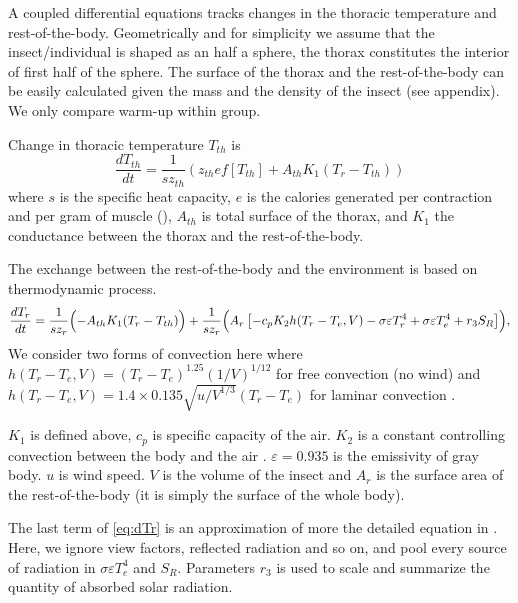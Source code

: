 A coupled differential equations  tracks changes in the thoracic temperature and rest-of-the-body.%
Geometrically and for simplicity we  assume that the insect/individual is shaped as an half a sphere, the thorax constitutes the interior of first half of the sphere.
The surface of the thorax and the rest-of-the-body can be easily calculated given the mass and the density of the insect (see appendix).
We only compare warm-up within group.

Change in thoracic temperature $T_{th}$ is 
\begin{equation} \label{eq:dTh}
	\frac{dT_{th}}{dt} = \frac{1}{s z_{th}} (z_{th} e f[T_{th}] +  A_{th} K_1(T_r - T_{th}))
\end{equation}
where $s$ is the specific heat capacity, $e$ is the calories generated per contraction and per gram of muscle (\citep{Kammer1974}), $A_{th}$ is total surface of the thorax, and $K_1$ the conductance between the thorax and the rest-of-the-body.

The exchange between the rest-of-the-body and the environment is based on thermodynamic process. 
\begin{equation} \label{eq:dTr} 
		\frac{dT_{r}}{dt} =  \frac{1}{s z_{r}} \Bigl( - A_{th} K_1(T_r - T_{th})  \Bigr)
			+ \frac{1}{s z_{r}} \Bigl( A_r \left[ - c_p K_2 h(T_r -T_e, V)- \sigma \varepsilon T_r^4 + \sigma \varepsilon T_e^4  + r_3 S_R  \right] \Bigr),
\end{equation}
We consider two forms of convection here where $ h(T_r -T_e, V) = (T_r- T_e)^{1.25} (1/V)^{1/12 }$ for free convection (no wind) and $ h(T_r -T_e, V) =  1.4 \times 0.135 \sqrt{u/V^{1/3}} (T_r- T_e) $ for laminar convection \citep{Campbell2012}.

$K_1$ is defined above, $c_p$ is specific capacity of the air. 
$K_2$ is a constant controlling convection between the body and the air \citep{Campbell2012}.
$\varepsilon = 0.935$  is the emissivity of gray body.
$u$ is wind speed.
$V$ is the volume of the insect and $A_r$ is the surface area of the rest-of-the-body (it is simply the surface of the whole body).

The last term of \cref{eq:dTr}  is an approximation of more the detailed equation in \citet{Campbell2012}.
Here, we ignore view factors, reflected radiation and so on, and pool every source of radiation in $ \sigma \varepsilon T_e^4$ and $S_R$. 
Parameters $r_3$ is used to scale and summarize the quantity of absorbed solar radiation.


